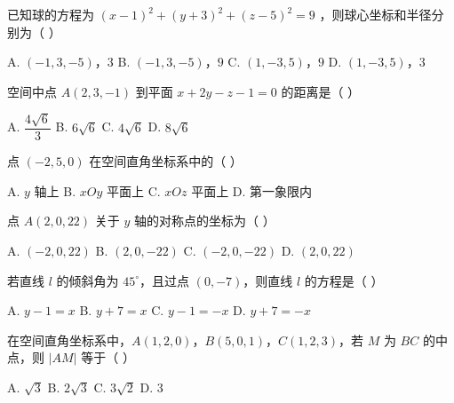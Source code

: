 \documentclass[11pt, a4paper]{article}
\begin{document}

\begin{baitap}[1]
已知球的方程为 $(x-1)^2 + (y+3)^2 + (z-5)^2 = 9$ ，则球心坐标和半径分别为（ ）
\par\vspace{3pt}
\noindent A. $(-1,3,-5)$，$3$ \quad B. $(-1,3,-5)$，$9$ \quad C. $(1,-3,5)$，$9$ \quad D. $(1,-3,5)$，$3$
\end{baitap}

\begin{baitap}[2]
空间中点 $A(2,3,-1)$ 到平面 $x + 2y - z - 1 = 0$ 的距离是（ ）
\par\vspace{3pt}
\noindent A. $\dfrac{4\sqrt{6}}{3}$ \quad B. $6\sqrt{6}$ \quad C. $4\sqrt{6}$ \quad D. $8\sqrt{6}$
\end{baitap}

\begin{baitap}[3]
点 $(-2, 5, 0)$ 在空间直角坐标系中的（ ）
\par\vspace{3pt}
\noindent A. $y$ 轴上 \quad B. $xOy$ 平面上 \quad C. $xOz$ 平面上 \quad D. 第一象限内
\end{baitap}

\begin{baitap}[4]
点 $A(2,0,22)$ 关于 $y$ 轴的对称点的坐标为（ ）
\par\vspace{3pt}
\noindent A. $(-2,0,22)$ \quad B. $(2,0,-22)$ \quad C. $(-2,0,-22)$ \quad D. $(2,0,22)$
\end{baitap}

\begin{baitap}[5]
若直线 $l$ 的倾斜角为 $45^\circ$，且过点 $(0,-7)$，则直线 $l$ 的方程是（ ）
\par\vspace{3pt}
\noindent A. $y - 1 = x$ \quad B. $y + 7 = x$ \quad C. $y - 1 = -x$ \quad D. $y + 7 = -x$
\end{baitap}

\begin{baitap}[6]
在空间直角坐标系中，$A(1,2,0)$，$B(5,0,1)$，$C(1,2,3)$，若 $M$ 为 $BC$ 的中点，则 $\lvert AM \rvert$ 等于（ ）
\par\vspace{3pt}
\noindent A. $\sqrt{3}$ \quad B. $2\sqrt{3}$ \quad C. $3\sqrt{2}$ \quad D. 3
\end{baitap}
\end{document}
